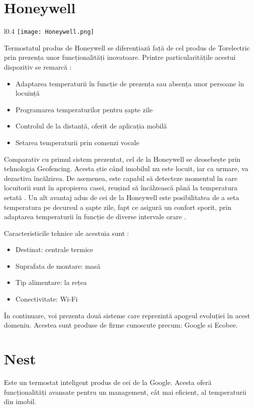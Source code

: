 \section{Honeywell}
\begin{wrapfigure}{l}{0.4\textwidth} 
\centering
\texttt{[image: Honeywell.png]}
\end{wrapfigure}
	Termostatul produs de Honeywell se diferențiază față de cel produs de Torelectric prin prezența unor funcționalități inovatoare. Printre particularitățile acestui dispozitiv se remarcă \cite{honeywell}:
	\begin{itemize}
	\setlength{\itemindent}{2em}
		\itemsep0em
		\item Adaptarea temperaturii în funcție de prezența sau absența unor persoane în locuință 
		\item Programarea temperaturilor pentru șapte zile
		\item Controlul de la distanță, oferit de aplicația mobilă
		\item Setarea temperaturii prin comenzi vocale
	\end{itemize}

	Comparativ cu primul sistem prezentat, cel de la Honeywell se deosebește prin tehnologia Geofencing. Acesta știe când imobilul nu este locuit, iar ca urmare, va dezactiva încălzirea. De asemenea, este capabil să detecteze momentul în care locuitorii sunt în apropierea casei, reușind să încălzească până la temperatura setată \cite{honeywell}.
	Un alt avantaj adus de cei de la Honeywell este posibilitatea de a seta temperatura pe decursul a șapte zile, fapt ce asigură un confort sporit, prin adaptarea temperaturii în funcție de diverse intervale orare \cite{honeywell}.

	Caracteristicile tehnice ale acestuia sunt \cite{honeywell}:
	\begin{itemize}
	\setlength{\itemindent}{2em}
		\itemsep0em
		\item Destinat: centrale termice
		\item Suprafata de montare: masă
		\item Tip alimentare: la rețea
		\item Conectivitate: Wi-Fi
	\end{itemize}

	În continuare, voi prezenta două sisteme care reprezintă apogeul evoluției în acest domeniu. Acestea sunt produse de firme cunoscute precum: Google si Ecobee.

\section{Nest}
	Este un termostat inteligent produs de cei de la Google. Acesta oferă funcționalități avansate pentru un management, cât mai eficient, al temperaturii din imobil. 

